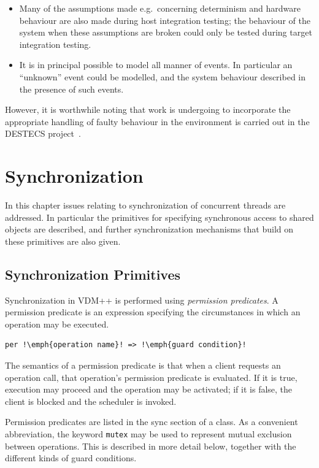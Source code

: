 \documentclass{overturerepchap}
\begin{document}
\begin{itemize}
\item Many of the assumptions made e.g.\ concerning determinism and
hardware behaviour are also made during host integration testing;
the behaviour of the system when these assumptions are broken could
only be tested during target integration testing.
\item It is in principal possible to model all manner of events. In
particular an ``unknown'' event could be modelled, and the system
behaviour described in the presence of such events.
\end{itemize}

However, it is worthwhile noting that work is undergoing to
incorporate the appropriate handling of faulty behaviour in the
environment is carried out in the DESTECS project~\cite{Broenink&10,Fitzgerald&10b,Fitzgerald&13a,Fitzgerald&13b}. 

\chapter{Synchronization}\label{chap:sync}

In this chapter issues relating to synchronization of concurrent
threads are addressed.  In particular the primitives for specifying
synchronous access to shared objects are described, and further
synchronization mechanisms that build on these primitives are also
given.

\section{Synchronization Primitives}

Synchronization in VDM++ is performed using \emph{permission predicates}. A
permission predicate is an expression specifying the circumstances in
which an operation may be executed.

\begin{lstlisting}
per !\emph{operation name}! => !\emph{guard condition}!
\end{lstlisting}

The semantics of a permission predicate is that when a client requests
an operation call, that operation's permission predicate is
evaluated. If it is true, execution may proceed and the operation may
be activated; if it is false, the client is blocked and the scheduler
is invoked.

Permission predicates are listed in the sync section of a class. As a
convenient abbreviation, the keyword \texttt{mutex} may be used to represent
mutual exclusion between operations. This is described in more detail
below, together with the different kinds of guard conditions.
\end{document}
